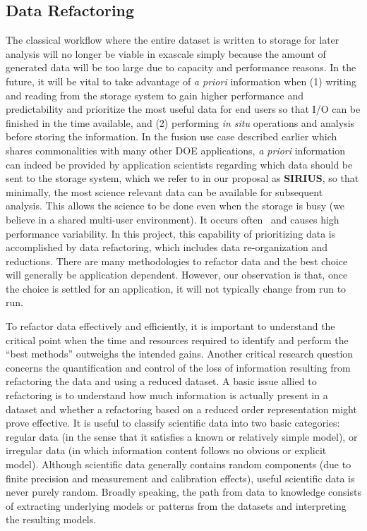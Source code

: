 \subsection{Data Refactoring} \label{sec:data-refactor} 

The classical workflow where the entire dataset is written to storage for
later analysis will no longer be viable in exascale simply because the amount of generated data will 
be too large due to capacity and performance reasons.
In the future, it will be vital to take advantage of \textit{a priori}
information when (1) writing and reading from the storage system to gain
higher performance and predictability and prioritize the most useful data 
for end users so that I/O can be finished in the time available, and (2)
performing {\em in situ} operations and analysis before storing the information.
In the fusion use case described earlier which shares commonalities with many other
DOE applications, \textit{a priori} information can indeed be provided by application
scientists regarding which data should be sent to the storage system, which we refer
to in our proposal as {\bf SIRIUS}, so that
minimally, the most science relevant data can be available for subsequent analysis.
This allows the science to be done even when the storage is busy (we believe
in a shared multi-user environment). It occurs often~\cite{liu_hotstorage} and causes
high performance variability.
In this project, this capability of prioritizing data is accomplished by data refactoring, 
which includes data re-organization and reductions.
There are many methodologies to refactor data and the best choice will generally
be application dependent. However, our observation is that, once the choice is settled for an application, 
it will not typically change from run to run. 

To refactor data effectively and efficiently, it is important to understand
the critical point when the time and resources required to
identify and perform the ``best methods'' outweighs the intended gains. Another
critical research question concerns the quantification and control of the loss
of information resulting from refactoring the data and using a reduced dataset. 
A basic issue allied to refactoring is to understand how much information is
actually present in a dataset and whether a refactoring based on a reduced
order representation might prove effective. It is useful to classify scientific
data into two basic categories: regular data (in the sense that it satisfies
a known or relatively simple model), or irregular data (in which information
content follows no obvious or explicit model).  Although scientific data
generally contains random components (due to finite precision and measurement and
calibration effects), useful scientific data is never purely random.
Broadly speaking, the path from data to knowledge consists of extracting
underlying models or patterns from the datasets and interpreting the resulting
models. 

